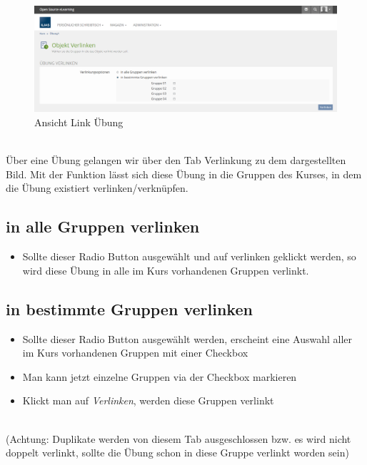 \begin{figure}[h!]
	\centering
	\includegraphics[width=1\textwidth]{img/linkUebung.png}
	\caption{Ansicht Link Übung}
\end{figure}

~\\Über eine Übung gelangen wir über den Tab Verlinkung zu dem dargestellten Bild. 
Mit der Funktion lässt sich diese Übung in die Gruppen des Kurses, in dem die Übung existiert verlinken/verknüpfen. 
\newpage
\subsection*{in alle Gruppen verlinken}
\begin{itemize}
	\item Sollte dieser Radio Button ausgewählt und auf verlinken geklickt werden, so wird diese Übung in alle im Kurs vorhandenen Gruppen verlinkt. 
\end{itemize}

\subsection*{in bestimmte Gruppen verlinken}
\begin{itemize}
	\item Sollte dieser Radio Button ausgewählt werden, erscheint eine Auswahl aller im Kurs vorhandenen Gruppen mit einer Checkbox
	\item Man kann jetzt einzelne Gruppen via der Checkbox markieren
	\item Klickt man auf \textit{Verlinken}, werden diese Gruppen verlinkt
\end{itemize}

~\\(Achtung: Duplikate werden von diesem Tab ausgeschlossen bzw. es wird nicht doppelt verlinkt, sollte die Übung schon in diese Gruppe verlinkt worden sein) 
\clearpage